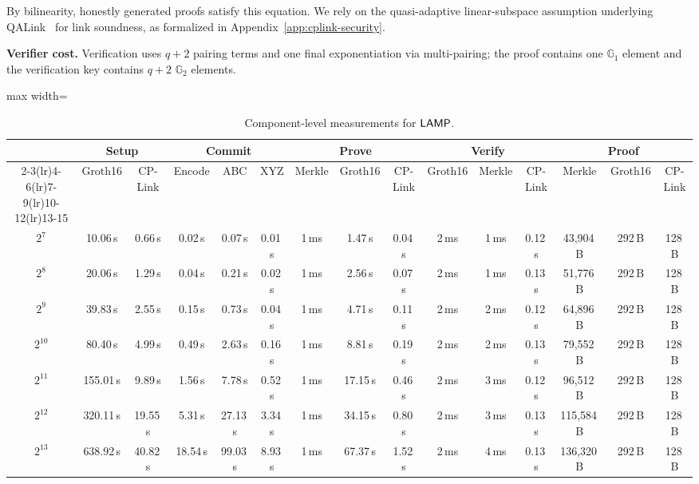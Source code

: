 By bilinearity, honestly generated proofs satisfy this equation.  We rely on
the quasi-adaptive linear-subspace assumption underlying
QALink~\cite{qa-nizk} for link soundness, as formalized in
Appendix~\ref{app:cplink-security}.

\noindent\textbf{Verifier cost.}
Verification uses \(q+2\) pairing terms and one final exponentiation via
multi-pairing; the proof contains one \(\mathbb{G}_1\) element and the
verification key contains \(q+2\) \(\mathbb{G}_2\) elements.

\begin{table}[!t]
\centering
\begin{revblock}[unbreakable]
\setlength{\tabcolsep}{3.5pt}
\begin{adjustbox}{max width=\linewidth}
\begin{tabular}{c cc ccc ccc ccc ccc}
\toprule
&
\multicolumn{2}{c}{\textbf{Setup}}
& \multicolumn{3}{c}{\textbf{Commit}}
& \multicolumn{3}{c}{\textbf{Prove}}
& \multicolumn{3}{c}{\textbf{Verify}}
& \multicolumn{3}{c}{\textbf{Proof}} \\
\cmidrule(lr){2-3}\cmidrule(lr){4-6}\cmidrule(lr){7-9}\cmidrule(lr){10-12}\cmidrule(lr){13-15}
\multirow{-2}{*}{\(\boldsymbol{k}\)}
& Groth16 & CP-Link
& Encode & ABC & XYZ
& Merkle & Groth16 & CP-Link
& Groth16 & Merkle & CP-Link
& Merkle & Groth16 & CP-Link \\
\midrule
$2^7$ & 10.06\,s & 0.66\,s & 0.02\,s & 0.07\,s & 0.01\,s & 1\,ms & 1.47\,s & 0.04\,s & 2\,ms & 1\,ms & 0.12\,s & 43{,}904\,B & 292\,B & 128\,B \\
$2^8$ & 20.06\,s & 1.29\,s & 0.04\,s & 0.21\,s & 0.02\,s & 1\,ms & 2.56\,s & 0.07\,s & 2\,ms & 1\,ms & 0.13\,s & 51{,}776\,B & 292\,B & 128\,B \\
$2^9$ & 39.83\,s & 2.55\,s & 0.15\,s & 0.73\,s & 0.04\,s & 1\,ms & 4.71\,s & 0.11\,s & 2\,ms & 2\,ms & 0.12\,s & 64{,}896\,B & 292\,B & 128\,B \\
$2^{10}$ & 80.40\,s & 4.99\,s & 0.49\,s & 2.63\,s & 0.16\,s & 1\,ms & 8.81\,s & 0.19\,s & 2\,ms & 2\,ms & 0.13\,s & 79{,}552\,B & 292\,B & 128\,B \\
$2^{11}$ & 155.01\,s & 9.89\,s & 1.56\,s & 7.78\,s & 0.52\,s & 1\,ms & 17.15\,s & 0.46\,s & 2\,ms & 3\,ms & 0.12\,s & 96{,}512\,B & 292\,B & 128\,B \\
$2^{12}$ & 320.11\,s & 19.55\,s & 5.31\,s & 27.13\,s & 3.34\,s & 1\,ms & 34.15\,s & 0.80\,s & 2\,ms & 3\,ms & 0.13\,s & 115{,}584\,B & 292\,B & 128\,B \\
$2^{13}$ & 638.92\,s & 40.82\,s & 18.54\,s & 99.03\,s & 8.93\,s & 1\,ms & 67.37\,s & 1.52\,s & 2\,ms & 4\,ms & 0.13\,s & 136{,}320\,B & 292\,B & 128\,B \\
\bottomrule
\end{tabular}
\end{adjustbox}
\end{revblock}
\vspace{6pt}
\caption{Component-level measurements for \(\textsf{LAMP}\).}
\label{tab:lamp-breakdown}
\end{table}

